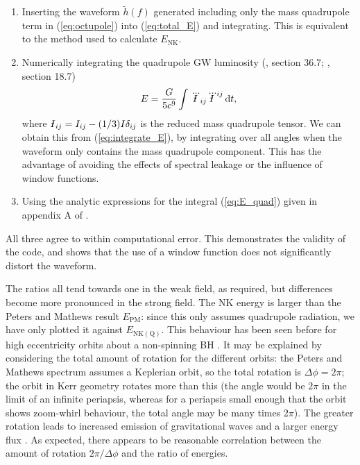\documentclass[useAMS,usedcolumn,usegraphicx,usenatbib]{mn2e}
\newcommand{\eqnref}[1]{(\ref{eq:#1})}
\newcommand{\sub}[1]{\ensuremath{_\mathrm{#1}}}
\newcommand{\dd}{\ensuremath{\mathrm{d}}}
\newcommand{\intd}[4]{\ensuremath{\int_{#1}^{#2}{#3}\,\dd{#4}}}
\newcommand{\Ibar}{{\declareslashed{}{\text{-}}{0.04}{-0.2}{I}\slashed{I}}}
\begin{document}
\begin{enumerate}
\item Inserting the waveform $\widetilde{h}(f)$ generated including only the mass quadrupole term in \eqnref{octupole} into \eqnref{total_E} and integrating. This is equivalent to the method used to calculate $E\sub{NK}$.
\item Numerically integrating the quadrupole GW luminosity (\citealt{Misner1973}, section 36.7; \citealt{Hobson2006}, section 18.7)
\begin{equation}
E = \frac{G}{5c^9}\intd{}{}{\dddot{\Ibar}_{ij}\dddot{\Ibar}^{ij}}{t},
\label{eq:E_quad}
\end{equation}
where $\Ibar_{ij} = I_{ij} - (1/3)I\delta_{ij}$ is the reduced mass quadrupole tensor. We can obtain this from \eqnref{integrate_E}, by integrating over all angles when the waveform only contains the mass quadrupole component. This has the advantage of avoiding the effects of spectral leakage or the influence of window functions.
\item Using the analytic expressions for the integral \eqnref{E_quad} given in appendix A of \citet{Gair2005}.
\end{enumerate}
All three agree to within computational error. This demonstrates the validity of the code, and shows that the use of a window function does not significantly distort the waveform.

The ratios all tend towards one in the weak field, as required, but differences become more pronounced in the strong field. The NK energy is larger than the Peters and Mathews result $E\sub{PM}$: since this only assumes quadrupole radiation, we have only plotted it against $E\sub{NK(Q)}$. This behaviour has been seen before for high eccentricity orbits about a non-spinning BH \citep{Gair2005}. It may be explained by considering the total amount of rotation for the different orbits: the Peters and Mathews spectrum assumes a Keplerian orbit, so the total rotation is $\Delta\phi = 2\pi$; the orbit in Kerr geometry rotates more than this (the angle would be $2\pi$ in the limit of an infinite periapsis, whereas for a periapsis small enough that the orbit shows zoom-whirl behaviour, the total angle may be many times $2\pi$). The greater rotation leads to increased emission of gravitational waves and a larger energy flux \citep{Berry2010}. As expected, there appears to be reasonable correlation between the amount of rotation $2\pi/\Delta\phi$ and the ratio of energies.
\end{document}

